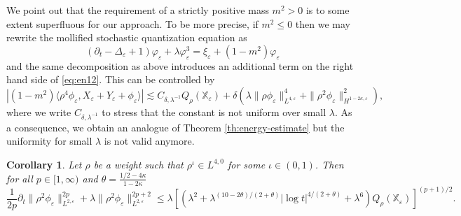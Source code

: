 \documentclass[a4paper,11pt]{article}
\newtheorem{corollary}[theorem]{Corollary}
{\theorembodyfont{\rmfamily}\newtheorem{remark}[theorem]{Remark}}
\numberwithin{equation}{section}
\begin{document}
\begin{remark}\label{rem:neg-mass}
We point out that the requirement of a strictly positive mass $m^{2}>0$ is to some extent superfluous for our approach. To be more precise, if $m^{2}\leqslant 0$ then we may rewrite the mollified stochastic quantization equation as
$$
(\partial_{t}-\Delta_{\varepsilon} +1)\varphi_{\varepsilon} +\lambda\varphi_{\varepsilon}^{3}=\xi_{\varepsilon}+(1-m^{2})\varphi_{\varepsilon}
$$
and the same decomposition as above introduces an additional term on the right hand side of \eqref{eq:en12}. This can be controlled by
$$
|(1-m^{2})\langle \rho^{4}\phi_{\varepsilon},X_{\varepsilon}+Y_{\varepsilon}+\phi_{\varepsilon}\rangle|\lesssim C_{\delta,\lambda^{-1}}Q_{\rho}(\mathbb{X}_{\varepsilon})+\delta(\lambda\|\rho\phi_{\varepsilon}\|_{L^{4,\varepsilon}}^{4}+\|\rho^{2}\phi_{\varepsilon}\|_{H^{1-2\kappa,\varepsilon}}^{2}),
$$
where we write $C_{\delta,\lambda^{-1}}$ to stress that the constant is not uniform over small $\lambda$.
As a consequence, we obtain an analogue of Theorem \ref{th:energy-estimate} but the uniformity  for small $\lambda$ is not valid anymore.
\end{remark}



\begin{corollary}
  \label{cor:Lp}Let $\rho$ be a weight such that $\rho^{\iota} \in L^{4, 0}$
  for some $\iota \in (0, 1)$. Then
  for all $p \in [1, \infty)$ and    $\theta=\frac{1/2-4\kappa}{1-2\kappa}$
  \begin{equation}\label{eq:lp} \frac{1}{2 p} \partial_t \| \rho^2 \phi_{\varepsilon} \|_{L^{2,
     \varepsilon}}^{2 p} + \lambda \| \rho^2 \phi_{\varepsilon} \|_{L^{2,
     \varepsilon}}^{2 p + 2} \leqslant  \lambda [(\lambda^{2} + \lambda^{(10 - 2\theta)
     / (2 + \theta)} | \log t|^{4 / (2 + \theta)} + \lambda^{6}) Q_{\rho}
     (\mathbb{X}_{\varepsilon})]^{(p + 1) / 2} .
     \end{equation}
\end{corollary}
\end{document}
